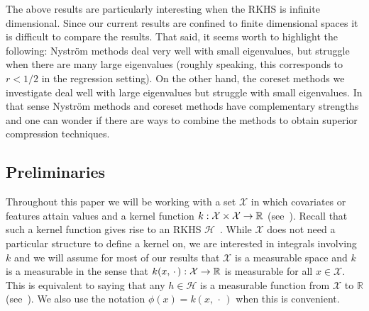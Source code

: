 \documentclass[AHL,Unicode,longabstracts,published]{cedram}
\theoremstyle{remark}
\newcommand{\R}{\mathbb{R}}
\newcommand{\X}{\mathcal{X}}
\newcommand{\cH}{\mathcal{H}}
\renewcommand*{\to}{\mathchoice{\longrightarrow}{\rightarrow}{\rightarrow}{\rightarrow}}
\begin{document}
The above results are particularly interesting when the RKHS is infinite dimensional. Since our current results are confined to finite dimensional spaces it is difficult to compare the results. That said, it seems worth to highlight the following: Nystr\"om methods deal very well with small eigenvalues, but struggle when there are many large eigenvalues (roughly speaking, this corresponds to $r<1/2$ in the regression setting). On the other hand, the coreset methods we investigate deal well with large eigenvalues but struggle with small eigenvalues. In that sense Nystr\"om methods and coreset methods have complementary strengths and one can wonder if there are ways to combine the methods to obtain superior compression techniques.


\subsection{Preliminaries} \label{sec:prelim}
Throughout this paper we will be working with a set $\X$ in which covariates or features attain values and a kernel function $k:\X \times \X \to
\R$ (see~\cite[Definition~2.12]{PAUL16}). Recall that such a kernel function gives rise to an RKHS $\cH$~\cite[Definition~2.14]{PAUL16}. While $\X$ does not need a particular structure to define a kernel on, we are interested in integrals involving $k$ and we will assume for most of our results that $\X$ is a measurable space and $k$ is a measurable in the sense that $k(x,\,\cdot\,): \X
\to \R$ is measurable for all $x\in \X$. This is equivalent to saying that any $h \in \cH$ is a measurable function from $\X$ to $\R$ (see~\cite[Lemma~4.24]{STEIN08}). We also use the notation $\phi(x) = k(x,\,\cdot\,)$ when this is convenient.
\end{document}
